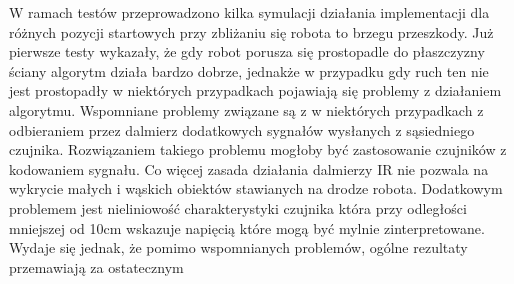 W ramach testów przeprowadzono kilka symulacji działania implementacji dla
różnych pozycji startowych przy zbliżaniu się robota to brzegu przeszkody. Już
pierwsze testy wykazały, że gdy robot porusza się prostopadle do płaszczyzny
ściany algorytm działa bardzo dobrze, jednakże w przypadku gdy ruch ten nie jest
prostopadły w niektórych przypadkach pojawiają się problemy z działaniem
algorytmu. Wspomniane problemy związane są z w niektórych przypadkach z
odbieraniem przez dalmierz dodatkowych sygnałów wysłanych z sąsiedniego czujnika.
Rozwiązaniem takiego problemu mogłoby być zastosowanie czujników z kodowaniem
sygnału. Co więcej zasada działania dalmierzy IR nie pozwala na wykrycie małych i
wąskich obiektów stawianych na drodze robota. Dodatkowym problemem jest
nieliniowość charakterystyki czujnika która przy odległości mniejszej od 10cm
wskazuje napięcią które mogą być mylnie zinterpretowane.  Wydaje się jednak, że
pomimo wspomnianych problemów, ogólne rezultaty przemawiają za ostatecznym
